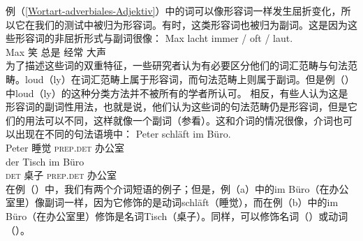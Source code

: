 例（\ref{Wortart-adverbiales-Adjektiv}）中的词可以像形容词一样发生屈折变化，所以它在我们的测试中被归为形容词。有时，这类形容词也被归为副词。这是因为这些形容词的非屈折形式与副词很像：
\ea
\gll Max lacht immer / oft / laut.\\
	 Max 笑 总是 {} 经常 {} 大声\\
\z
%
为了描述这些词的双重特征，一些研究者认为有必要区分他们的词汇范畴与句法范畴。loud（ly）在词汇范畴上属于形容词，而句法范畴上则属于副词。但是例（）中loud（ly）的这种分类方法并不被所有的学者所认可。
相反，有些人认为这是形容词的副词性用法，也就是说，他们认为这些词的句法范畴仍是形容词，但是它们的用法可以不同，这样就像一个副词（参看\citealp[\S~7.3]{Eisenberg2004a}）。这和介词的情况很像，介词也可以出现在不同的句法语境中：
\eal
\ex 
\gll Peter schläft im Büro.\\
     Peter 睡觉 \textsc{prep}.\textsc{det} 办公室\\
\ex 
\gll der Tisch im Büro\\
     \textsc{det} 桌子 \textsc{prep}.\textsc{det} 办公室\\
\zl
在例（）中，我们有两个介词短语的例子；但是，例（a）中的im Büro（在办公室里）像副词一样，因为它修饰的是动词schläft（睡觉），而在例（b）中的im Büro（在办公室里）修饰是名词Tisch（桌子）。同样，可以修饰名词（）或动词（）。
